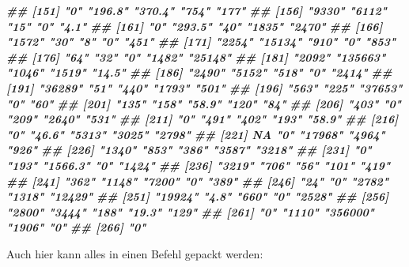\documentclass[
  ngerman,
]{article}
\newenvironment{Shaded}{\begin{snugshade}}{\end{snugshade}}
\newcommand{\DocumentationTok}[1]{\textcolor[rgb]{0.56,0.35,0.01}{\textbf{\textit{#1}}}}
\newcommand{\FunctionTok}[1]{\textcolor[rgb]{0.00,0.00,0.00}{#1}}
\newcommand{\NormalTok}[1]{#1}
\newcommand{\OtherTok}[1]{\textcolor[rgb]{0.56,0.35,0.01}{#1}}
\newcommand{\SpecialCharTok}[1]{\textcolor[rgb]{0.00,0.00,0.00}{#1}}
\newcommand{\StringTok}[1]{\textcolor[rgb]{0.31,0.60,0.02}{#1}}
\begin{document}
\begin{Shaded}
\begin{Highlighting}[]
\DocumentationTok{\#\# [151] "0"       "196.8"   "370.4"   "754"     "177"    }
\DocumentationTok{\#\# [156] "9330"    "6112"    "15"      "0"       "4.1"    }
\DocumentationTok{\#\# [161] "0"       "293.5"   "40"      "1835"    "2470"   }
\DocumentationTok{\#\# [166] "1572"    "30"      "8"       "0"       "451"    }
\DocumentationTok{\#\# [171] "2254"    "15134"   "910"     "0"       "853"    }
\DocumentationTok{\#\# [176] "64"      "32"      "0"       "1482"    "25148"  }
\DocumentationTok{\#\# [181] "2092"    "135663"  "1046"    "1519"    "14.5"   }
\DocumentationTok{\#\# [186] "2490"    "5152"    "518"     "0"       "2414"   }
\DocumentationTok{\#\# [191] "36289"   "51"      "440"     "1793"    "501"    }
\DocumentationTok{\#\# [196] "563"     "225"     "37653"   "0"       "60"     }
\DocumentationTok{\#\# [201] "135"     "158"     "58.9"    "120"     "84"     }
\DocumentationTok{\#\# [206] "403"     "0"       "209"     "2640"    "531"    }
\DocumentationTok{\#\# [211] "0"       "491"     "402"     "193"     "58.9"   }
\DocumentationTok{\#\# [216] "0"       "46.6"    "5313"    "3025"    "2798"   }
\DocumentationTok{\#\# [221] NA        "0"       "17968"   "4964"    "926"    }
\DocumentationTok{\#\# [226] "1340"    "853"     "386"     "3587"    "3218"   }
\DocumentationTok{\#\# [231] "0"       "193"     "1566.3"  "0"       "1424"   }
\DocumentationTok{\#\# [236] "3219"    "706"     "56"      "101"     "419"    }
\DocumentationTok{\#\# [241] "362"     "1148"    "7200"    "0"       "389"    }
\DocumentationTok{\#\# [246] "24"      "0"       "2782"    "1318"    "12429"  }
\DocumentationTok{\#\# [251] "19924"   "4.8"     "660"     "0"       "2528"   }
\DocumentationTok{\#\# [256] "2800"    "3444"    "188"     "19.3"    "129"    }
\DocumentationTok{\#\# [261] "0"       "1110"    "356000"  "1906"    "0"      }
\DocumentationTok{\#\# [266] "0"}
\end{Highlighting}
\end{Shaded}

Auch hier kann alles in einen Befehl gepackt werden:

\begin{Shaded}
\end{Shaded}
\end{document}
